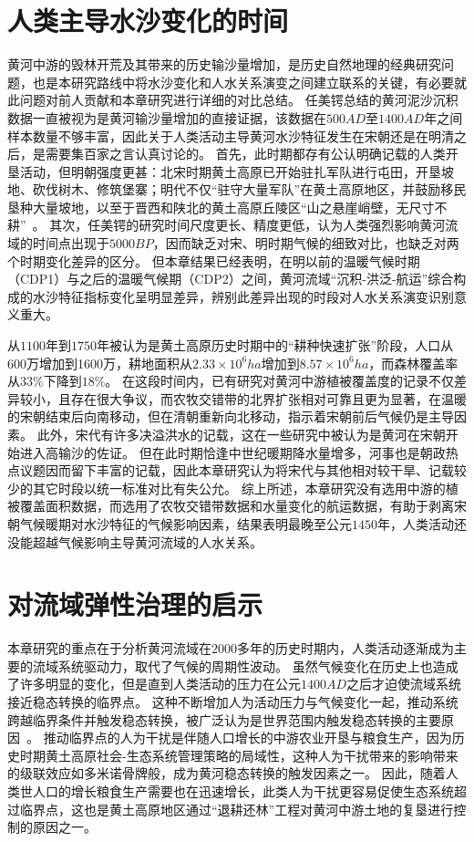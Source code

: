\section{人类主导水沙变化的时间}

黄河中游的毁林开荒及其带来的历史输沙量增加，是历史自然地理的经典研究问题，也是本研究路线中将水沙变化和人水关系演变之间建立联系的关键，有必要就此问题对前人贡献和本章研究进行详细的对比总结。
任美锷总结的黄河泥沙沉积数据一直被视为是黄河输沙量增加的直接证据\cite{renmeie2006}，该数据在$500AD$至$1400AD$年之间样本数量不够丰富，因此关于人类活动主导黄河水沙特征发生在宋朝还是在明清之后，是需要集百家之言认真讨论的。
首先，此时期都存有公认明确记载的人类开垦活动，但明朝强度更甚：北宋时期黄土高原已开始驻扎军队进行屯田，开垦坡地、砍伐树木、修筑堡寨；明代不仅“驻守大量军队”在黄土高原地区，并鼓励移民垦种大量坡地，以至于晋西和陕北的黄土高原丘陵区“山之悬崖峭壁，无尺寸不耕”~\cite{renmeie2006,wu2020a,shinianhai1985}。
其次，任美锷的研究时间尺度更长、精度更低，认为人类强烈影响黄河流域的时间点出现于$5000BP$，因而缺乏对宋、明时期气候的细致对比，也缺乏对两个时期变化差异的区分\cite{renmeie2006, mei-e1994}。
但本章结果已经表明，在明以前的温暖气候时期（CDP1）与之后的温暖气候期（CDP2）之间，黄河流域“沉积-洪泛-航运”综合构成的水沙特征指标变化呈明显差异，辨别此差异出现的时段对人水关系演变识别意义重大。

从$1100$年到$1750$年被认为是黄土高原历史时期中的“耕种快速扩张”阶段，人口从600万增加到1600万，耕地面积从$2.33 \times 10^6 ha$增加到$8.57 \times 10^6 ha$，而森林覆盖率从$33\%$下降到$18\%$\cite{wu2020a}。
在这段时间内，已有研究对黄河中游植被覆盖度的记录不仅差异较小，且存在很大争议，而农牧交错带的北界扩张相对可靠且更为显著，在温暖的宋朝结束后向南移动，但在清朝重新向北移动，指示着宋朝前后气候仍是主导因素\cite{shinianhai1985,GeQuanSheng2011}。
此外，宋代有许多决溢洪水的记载，这在一些研究中被认为是黄河在宋朝开始进入高输沙的佐证\cite{chen2012}。
但在此时期恰逢中世纪暖期降水量增多，河事也是朝政热点议题因而留下丰富的记载，因此本章研究认为将宋代与其他相对较干旱、记载较少的其它时段以统一标准对比有失公允。
综上所述，本章研究没有选用中游的植被覆盖面积数据，而选用了农牧交错带数据和水量变化的航运数据，有助于剥离宋朝气候暖期对水沙特征的气候影响因素，结果表明最晚至公元$1450$年，人类活动还没能超越气候影响主导黄河流域的人水关系。


\section{对流域弹性治理的启示}

本章研究的重点在于分析黄河流域在$2000$多年的历史时期内，人类活动逐渐成为主要的流域系统驱动力，取代了气候的周期性波动。
虽然气候变化在历史上也造成了许多明显的变化，但是直到人类活动的压力在公元$1400AD$之后才迫使流域系统接近稳态转换的临界点。
这种不断增加人为活动压力与气候变化一起，推动系统跨越临界条件并触发稳态转换，被广泛认为是世界范围内触发稳态转换的主要原因~\cite{scheffer2001,scheffer2003}。
推动临界点的人为干扰是伴随人口增长的中游农业开垦与粮食生产，因为历史时期黄土高原社会-生态系统管理策略的局域性，这种人为干扰带来的影响带来的级联效应如多米诺骨牌般，成为黄河稳态转换的触发因素之一\cite{rocha2018,wu2020a}。
因此，随着人类世人口的增长粮食生产需要也在迅速增长，此类人为干扰更容易促使生态系统超过临界点，这也是黄土高原地区通过“退耕还林”工程对黄河中游土地的复垦进行控制的原因之一。

